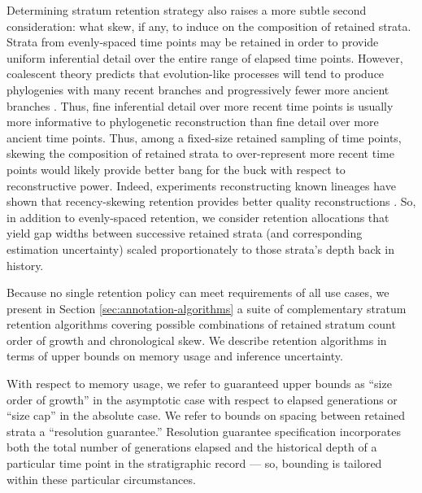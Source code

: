 Determining stratum retention strategy also raises a more subtle second consideration: what skew, if any, to induce on the composition of retained strata.
Strata from evenly-spaced time points may be retained in order to provide uniform inferential detail over the entire range of elapsed time points.
However, coalescent theory predicts that evolution-like processes will tend to produce phylogenies with many recent branches and progressively fewer more ancient branches \citep{nordborgCoalescentTheory2019, berestyckiRecentProgressCoalescent2009}.
Thus, fine inferential detail over more recent time points is usually more informative to phylogenetic reconstruction than fine detail over more ancient time points.
Thus, among a fixed-size retained sampling of time points, skewing the composition of retained strata to over-represent more recent time points would likely provide better bang for the buck with respect to reconstructive power.
Indeed, experiments reconstructing known lineages have shown that recency-skewing retention provides better quality reconstructions \citep{moreno2022hereditary}.
So, in addition to evenly-spaced retention, we consider retention allocations that yield gap widths between successive retained strata (and corresponding estimation uncertainty) scaled proportionately to those strata's depth back in history.

Because no single retention policy can meet requirements of all use cases, we present in Section \ref{sec:annotation-algorithms} a suite of complementary stratum retention algorithms covering possible combinations of retained stratum count order of growth and chronological skew.
We describe retention algorithms in terms of upper bounds on memory usage and inference uncertainty.

With respect to memory usage, we refer to guaranteed upper bounds as ``size order of growth'' in the asymptotic case with respect to elapsed generations or ``size cap'' in the absolute case.
We refer to bounds on spacing between retained strata a ``resolution guarantee.''
Resolution guarantee specification incorporates both the total number of generations elapsed and the historical depth of a particular time point in the stratigraphic record --- so, bounding is tailored within these particular circumstances.

